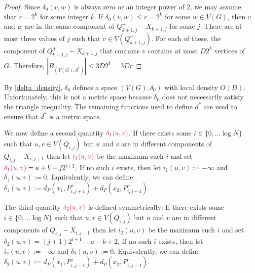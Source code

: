 \documentclass{patmorin}
\makeatletter
\renewcommand{\ge}{\geqslant}
\renewcommand{\le}{\leqslant}
\newcommand{\pat}[1]{\textcolor{Blue}{Pat: #1}}
\newcommand{\gwen}[1]{\textcolor{Purple}{Gwen: #1}}
\def\mathcolor#1#{\@mathcolor{#1}}
\def\@mathcolor#1#2#3{%
  \protect\leavevmode
  \begingroup
    \color#1{#2}#3%
  \endgroup
}
\newcommand{\mathdefin}[1]{\mathcolor{brightmaroon}{#1}}
\makeatother
\begin{document}
\begin{proof}
  Since $\delta_0(v,w)$ is always zero or an integer power of $2$, we may assume that $r=2^k$ for some integer $k$.  If $\delta_0(v,w)\le r=2^k$ for some $w\in V(G)$, then $v$ and $w$ are in the same component of $Q^+_{k+1,j}-X_{k+1,j}$ for some $j$.
  There are at most three values of $j$ such that $v\in V(Q^+_{k+1,j})$.  For each of these, the component of $Q^+_{k+1,j}-X_{k+1,j}$ that contains $v$ contains at most $D2^{k}$ vertices of $G$. Therefore, $|B_{(V(G),d^*)}| \le 3D 2^{k}= 3Dr$
\end{proof}

By \cref{delta_density}, $\delta_0$ defines a space $(V(G),\delta_0)$ with local density $O(D)$.  Unfortunately, this is not a metric space because $\delta_0$ does not necessarily satisfy the triangle inequality.  The remaining functions used to define $d^*$ are used to ensure that $d^*$ is a metric space.

We now define a second quantity $\mathdefin{\delta_1(u,v)}$.  If there exists some $i\in\{0,\ldots\log N\}$ such that $u,v\in V(Q_{i,j})$ but $u$ and $v$ are in different components of $Q_{i,j}-X_{i,j+1}$ then let $\mathdefin{i_1(u,v)}$ be the maximum such $i$ and set $\mathdefin{\delta_1(u,v)}=a+b-j2^{i+1}$. If no such $i$ exists, then let $i_1(u,v):=-\infty$ and $\delta_1(u,v):=0$.
Equivalently, we can define $\delta_1(u,v):=d_{P}(x_1,\overline{P^+_{i,j+1}})+d_{P}(x_2,\overline{P^+_{i,j+1}})$.

The third quantity $\mathdefin{\delta_2(u,v)}$ is defined symmetrically: If there exists some $i\in\{0,\ldots\log N\}$ such that $u,v\in V(Q_{i,j})$ but $u$ and $v$ are in different components of $Q_{i,j}-X_{i,j-1}$ then let $i_2(u,v)$ be the maximum such $i$ and set $\delta_2(u,v)=(j+1)2^{i+1}-a-b+2$. If no such $i$ exists, then let $i_2(u,v):=-\infty$ and $\delta_2(u,v):=0$.  Equivalently, we can define $\delta_2(u,v):=d_{P}(x_1,\overline{P^+_{i,j-1}})+d_{P}(x_2,\overline{P^+_{i,j-1}})$.
\end{document}
